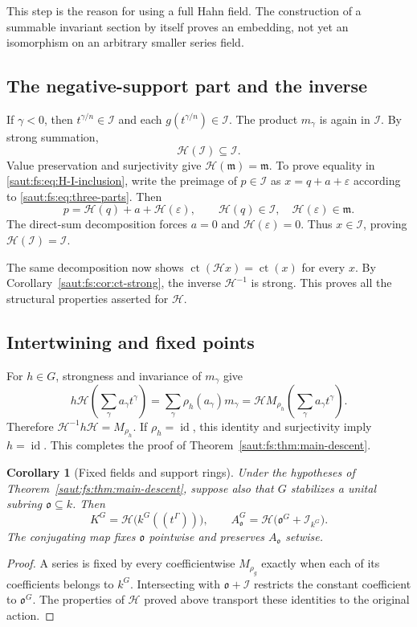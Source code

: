 \documentclass[11pt]{article}
\newtheorem{corollary}[theorem]{Corollary}
\theoremstyle{definition}
\theoremstyle{remark}
\newcommand{\mm}{\mathfrak m}
\newcommand{\id}{\operatorname{id}}
\newcommand{\ct}{\operatorname{ct}}
\newcommand{\Ineg}{\mathcal I}
\numberwithin{equation}{section}
\begin{document}
This step is the reason for using a full Hahn field. The construction of a summable
invariant section by itself proves an embedding, not yet an isomorphism on an
arbitrary smaller series field.

\subsection{The negative-support part and the inverse}

If $\gamma<0$, then $t^{\gamma/n}\in\Ineg$ and each $g(t^{\gamma/n})\in\Ineg$. The
product $m_\gamma$ is again in $\Ineg$. By strong summation,
\begin{equation}\label{saut:fs:eq:H-I-inclusion}
 \mathcal H(\Ineg)\subseteq\Ineg.
\end{equation}
Value preservation and surjectivity give $\mathcal H(\mm)=\mm$. To prove equality in
\eqref{saut:fs:eq:H-I-inclusion}, write the preimage of $p\in\Ineg$ as
$x=q+a+\varepsilon$ according to \eqref{saut:fs:eq:three-parts}. Then
\[
 p=\mathcal H(q)+a+\mathcal H(\varepsilon),\qquad
 \mathcal H(q)\in\Ineg,\quad \mathcal H(\varepsilon)\in\mm.
\]
The direct-sum decomposition forces $a=0$ and $\mathcal H(\varepsilon)=0$. Thus
$x\in\Ineg$, proving $\mathcal H(\Ineg)=\Ineg$.

The same decomposition now shows $\ct(\mathcal Hx)=\ct(x)$ for every $x$. By
Corollary~\ref{saut:fs:cor:ct-strong}, the inverse $\mathcal H^{-1}$ is strong. This
proves all the structural properties asserted for $\mathcal H$.

\subsection{Intertwining and fixed points}

For $h\in G$, strongness and invariance of $m_\gamma$ give
\[
 h\mathcal H\left(\sum_\gamma a_\gamma t^\gamma\right)
 =\sum_\gamma\rho_h(a_\gamma)m_\gamma
 =\mathcal HM_{\rho_h}\left(\sum_\gamma a_\gamma t^\gamma\right).
\]
Therefore $\mathcal H^{-1}h\mathcal H=M_{\rho_h}$. If $\rho_h=\id$, this identity and
surjectivity imply $h=\id$. This completes the proof of
Theorem~\ref{saut:fs:thm:main-descent}.

\begin{corollary}[Fixed fields and support rings]\label{saut:fs:cor:fixed-general}
Under the hypotheses of Theorem~\ref{saut:fs:thm:main-descent}, suppose also that
$G$ stabilizes a unital subring $\mathfrak o\subseteq k$. Then
\[
 K^G=\mathcal H\bigl(k^G((t^\Gamma))\bigr),\qquad
 A_{\mathfrak o}^G=\mathcal H\bigl(\mathfrak o^G+\Ineg_{k^G}\bigr).
\]
The conjugating map fixes $\mathfrak o$ pointwise and preserves $A_{\mathfrak o}$
setwise.
\end{corollary}
\begin{proof}
A series is fixed by every coefficientwise $M_{\rho_g}$ exactly when each of its
coefficients belongs to $k^G$. Intersecting with $\mathfrak o+\Ineg$ restricts the
constant coefficient to $\mathfrak o^G$. The properties of $\mathcal H$ proved above
transport these identities to the original action.
\end{proof}
\end{document}
